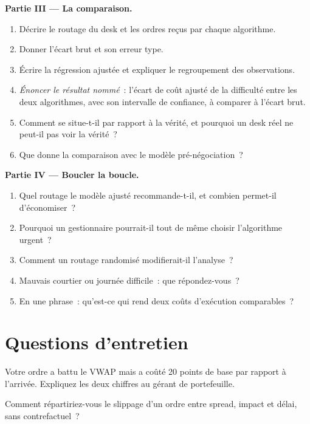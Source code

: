 \begin{problem}
\medskip\noindent\textbf{Partie III --- La comparaison.}
\begin{enumerate}[resume]
\item Décrire le routage du desk et les ordres reçus par chaque algorithme.
\item Donner l'écart brut et son erreur type.
\item Écrire la régression ajustée et expliquer le regroupement des observations.
\item \emph{Énoncer le résultat nommé}~: l'écart de coût ajusté de la difficulté entre les deux algorithmes, avec son intervalle de confiance, à comparer à
l'écart brut.
\item Comment se situe-t-il par rapport à la vérité, et pourquoi un desk réel ne peut-il pas voir la vérité~?
\item Que donne la comparaison avec le modèle pré-négociation~?
\end{enumerate}

\medskip\noindent\textbf{Partie IV --- Boucler la boucle.}
\begin{enumerate}[resume]
\item Quel routage le modèle ajusté recommande-t-il, et combien permet-il d'économiser~?
\item Pourquoi un gestionnaire pourrait-il tout de même choisir l'algorithme urgent~?
\item Comment un routage randomisé modifierait-il l'analyse~?
\item Mauvais courtier ou journée difficile~: que répondez-vous~?
\item En une phrase~: qu'est-ce qui rend deux coûts d'exécution comparables~?
\end{enumerate}
\end{problem}

\section{Questions d'entretien}

\begin{interviewq}\label{iq:mx:transaction-cost-analysis:1}
Votre ordre a battu le VWAP mais a coûté 20 points de base par rapport à l'arrivée. Expliquez les deux chiffres au gérant de portefeuille.
\end{interviewq}

\begin{interviewq}\label{iq:mx:transaction-cost-analysis:2}
Comment répartiriez-vous le slippage d'un ordre entre spread, impact et délai, sans contrefactuel~?
\end{interviewq}

